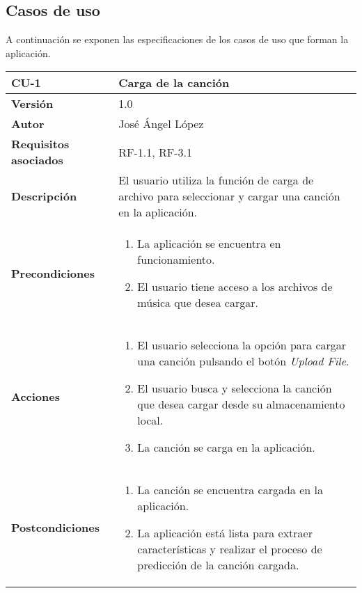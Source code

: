 
\subsection{Casos de uso}

A continuación se exponen las especificaciones de los casos de uso que forman la aplicación.

\begin{table}[p]
	\centering
	\begin{tabularx}{\linewidth}{ p{} p{} }
		\toprule
		\textbf{CU-1}    & \textbf{Carga de la canción}\\
		\toprule
		\textbf{Versión}              & 1.0    \\
		\textbf{Autor}                & José Ángel López \\
		\textbf{Requisitos asociados} & RF-1.1, RF-3.1 \\
		\textbf{Descripción}          & El usuario utiliza la función de carga de archivo para seleccionar y cargar una canción en la aplicación. \\
		\textbf{Precondiciones}        & 
		\begin{enumerate}		    
			\def\labelenumi{\arabic{enumi}.}
			\tightlist
			\item La aplicación se encuentra en funcionamiento.
			\item El usuario tiene acceso a los archivos de música que desea cargar.
		\end{enumerate}\\
		\textbf{Acciones}             &
		\begin{enumerate}
			\def\labelenumi{\arabic{enumi}.}
			\tightlist
			\item El usuario selecciona la opción para cargar una canción pulsando el botón \textit{Upload File}.
			\item El usuario busca y selecciona la canción que desea cargar desde su almacenamiento local.
			\item La canción se carga en la aplicación.
		\end{enumerate}\\
		\textbf{Postcondiciones} &
		\begin{enumerate}
			\def\labelenumi{\arabic{enumi}.}
			\tightlist
			\item La canción se encuentra cargada en la aplicación.
			\item La aplicación está lista para extraer características y realizar el proceso de predicción de la canción cargada.

\end{enumerate}
\end{tabularx}
\end{table}
